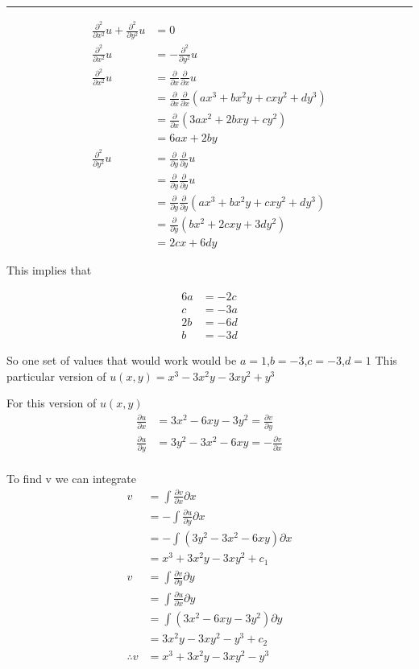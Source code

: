 \documentclass[12pt, oneside]{article}
\newenvironment{answer}
  {\vspace*{0.2cm} \rule{12cm}{0.02cm} \vspace*{0.2cm}}
  {\vspace*{0.2cm}}
\begin{document}
\begin{enumerate}
\begin{answer}
    \begin{align*}
      \frac{\partial^2}{\partial x^2}u + \frac{\partial^2}{\partial y^2}u &= 0\\
      \frac{\partial^2}{\partial x^2}u &= - \frac{\partial^2}{\partial y^2}u\\
      \frac{\partial^2}{\partial x^2}u &=\frac{\partial}{\partial x}\frac{\partial}{\partial x}u\\
      &=\frac{\partial}{\partial x}\frac{\partial}{\partial x}(ax^3 + bx^2y + cxy^2 + dy^3)\\
      &=\frac{\partial}{\partial x}(3ax^2+2bxy+cy^2)\\
      &=6ax+2by\\
      \frac{\partial^2}{\partial y^2}u &=\frac{\partial}{\partial y}\frac{\partial}{\partial y}u\\
      &=\frac{\partial}{\partial y}\frac{\partial}{\partial y}u\\
      &=\frac{\partial}{\partial y}\frac{\partial}{\partial y}(ax^3 + bx^2y + cxy^2 + dy^3)\\
      &=\frac{\partial}{\partial y}(bx^2+2cxy+3dy^2)\\
      &=2cx+6dy
    \end{align*}

    This implies that

    \begin{align*}
      6a &= -2c\\
      c &= -3a\\
      2b &= -6d\\
      b &= -3d
    \end{align*}

    So one set of values that would work would be $a=1$,$b=-3$,$c=-3$,$d=1$
    This particular version of $u(x,y) = x^3 -3x^2y -3xy^2 + y^3$

    For this version of $u(x,y)$
    \begin{align*}
      \frac{\partial u}{\partial x} &= 3x^2-6xy-3y^2 = \frac{\partial v}{\partial y}\\
      \frac{\partial u}{\partial y} &= 3y^2-3x^2-6xy = -\frac{\partial v}{\partial x}\\
    \end{align*}

    To find v we can integrate
    \begin{align*}
      v &= \int\frac{\partial v}{\partial x}\partial x\\
        &= -\int\frac{\partial u}{\partial y}\partial x\\
        &= -\int (3y^2-3x^2-6xy) \partial x\\
        &= x^3 +3x^2y-3xy^2 + c_1\\
      v &= \int\frac{\partial v}{\partial y}\partial y\\
        &= \int\frac{\partial u}{\partial x}\partial y\\
        &= \int(3x^2-6xy-3y^2)\partial y\\
        &= 3x^2y-3xy^2-y^3 + c_2\\
      \therefore v &= x^3 + 3x^2y - 3xy^2 - y^3
    \end{align*}
  \end{answer}


\end{enumerate}
\end{document}
